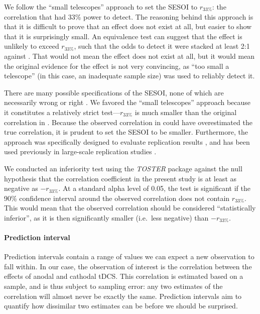 \documentclass[11pt,]{memoir}
\let\oldparagraph\paragraph
\renewcommand{\paragraph}[1]{\oldparagraph{#1}\mbox{}}
\begin{document}
We follow the ``small telescopes'' \autocite{Simonsohn2015} approach to set the SESOI to \(r_{33\%}\): the correlation that \textcite{London2015} had 33\% power to detect. The reasoning behind this approach is that it is difficult to prove that an effect does not exist at all, but easier to show that it is surprisingly small. An equivalence test can suggest that the effect is unlikely to exceed \(r_{33\%}\), such that the odds to detect it were stacked at least 2:1 against \textcite{London2015}. That would not mean the effect does not exist at all, but it would mean the original evidence for the effect is not very convincing, as ``too small a telescope'' (in this case, an inadequate sample size) was used to reliably detect it.

There are many possible specifications of the SESOI, none of which are necessarily wrong or right \autocite{Lakens2018}. We favored the ``small telescopes'' approach because it constitutes a relatively strict test---\(r_{33\%}\) is much smaller than the original correlation in \textcite{London2015}. Because the observed correlation in \textcite{London2015} could have overestimated the true correlation, it is prudent to set the SESOI to be smaller. Furthermore, the approach was specifically designed to evaluate replication results \autocite{Simonsohn2015}, and has been used previously in large-scale replication studies \autocite[e.g.][]{Camerer2018}.

We conducted an inferiority test using the \emph{TOSTER} package \autocite[Version 0.3.4;][]{R-TOSTER} against the null hypothesis that the correlation coefficient in the present study is at least as negative as \(-r_{33\%}\). At a standard alpha level of 0.05, the test is significant if the 90\% confidence interval around the observed correlation does not contain \(r_{33\%}\). This would mean that the observed correlation should be considered ``statistically inferior'', as it is then significantly smaller (i.e.~less negative) than \(-r_{33\%}\).

\hypertarget{pi}{%
\paragraph{Prediction interval}\label{pi}}

Prediction intervals contain a range of values we can expect a new observation to fall within. In our case, the observation of interest is the correlation between the effects of anodal and cathodal tDCS. This correlation is estimated based on a sample, and is thus subject to sampling error: any two estimates of the correlation will almost never be exactly the same. Prediction intervals aim to quantify how dissimilar two estimates can be before we should be surprised.
\end{document}
